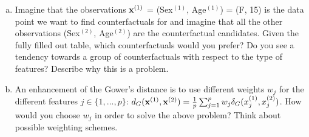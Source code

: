 {\begin{enumerate}[a)]
\item
Imagine that the observations $\mathbf{x}^{(1)}$ = (Sex$^{(1)}$, Age$^{(1)}$) = (F, 15) is the data point we want to
find counterfactuals for and imagine that all the other observations (Sex$^{(2)}$, Age$^{(2)}$)
are the counterfactual candidates.
Given the fully filled out table, which counterfactuals would you prefer?
Do you see a tendency towards a group of counterfactuals with respect to the
type of features? Describe why this is a problem.

\item An enhancement of the Gower's distance is to use different weights $w_j$ for the
different features $j \in \{1, ..., p\}$:
$ d_G(\mathbf{x}^{(1)}, \mathbf{x}^{(2)}) =  \frac{1}{p}\sum_{j = 1}^{p} w_j \delta_G(x_j^{(1)}, x_j^{(2)})$.
How would you choose $w_j$ in order to solve the above problem?
Think about possible weighting schemes.

\end{enumerate}
}
